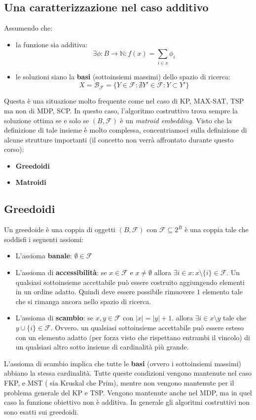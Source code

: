 \documentclass{article}
\begin{document}
\subsection{Una caratterizzazione nel caso additivo}
Assumendo che:
\begin{itemize}
    \item la funzione sia additiva:
          $$\exists\phi : B\rightarrow\mathbb{N}:f(x)=\sum_{i\in x}\phi_i$$
    \item le soluzioni siano la \textbf{basi} (sottoinsiemi massimi) dello spazio di ricerca:
          $$X=\mathcal{B}_\mathcal{F}=\{Y\in\mathcal{F}:\nexists Y'\in\mathcal{F}:Y\subset Y'\}$$
\end{itemize}
Questa è una situazione molto frequente come nel caso di KP, MAX-SAT, TSP ma non di MDP, SCP.
In questo caso, l'algoritmo costruttivo trova sempre la soluzione ottima se e solo se $(B,\mathcal{F})$
è un \textit{matroid embedding}. Visto che la definizione di tale insieme è molto complessa,
concentriamoci sulla definizione di alcune strutture importanti (il concetto non verrà
affrontato durante questo corso):
\begin{itemize}
    \item \textbf{Greedoidi}
    \item \textbf{Matroidi}
\end{itemize}

\subsection{Greedoidi}
Un greedoide è una coppia di oggetti $(B,\mathcal{F})$ con
$\mathcal{F}\subseteq 2^B$ è una coppia tale che soddisfi i seguenti assiomi:
\begin{itemize}
    \item L'assioma \textbf{banale}: $\emptyset\in\mathcal{F}$
    \item L'assioma di \textbf{accessibilità}: se $x\in\mathcal{F}$ e $x\neq\emptyset$ allora
          $\exists i\in x:x\setminus\{i\}\in\mathcal{F}$. Un qualsiasi sottoinsieme accettabile può
          essere costruito aggiungendo elementi in un ordine adatto. Quindi deve essere possibile
          rimuovere $1$ elemento tale che si rimanga ancora nello spazio di ricerca.
    \item L'assioma di \textbf{scambio}: se $x,y\in\mathcal{F}$ con $|x|=|y|+1$. allora $\exists i\in x\setminus y$
          tale che $y\cup\{i\}\in\mathcal{F}$. Ovvero. un qualsiasi sottoinsieme accettabile può
          essere esteso con un elemento adatto (per forza visto che rispettano entrambi il vincolo)
          di un qualsiasi altro sotto insieme di cardinalità più grande.
\end{itemize}
L'assioma di scambio implica che tutte le \textbf{basi} (ovvero i sottoinsiemi massimi)
abbiano la stessa cardinalità. Tutte queste condizioni vengono mantenute nel caso FKP, e MST (
sia Kruskal che Prim), mentre non vengono mantenute per il problema generale del KP e TSP.
Vengono mantenute anche nel MDP, ma in quel caso la funzione obiettivo non è additiva. In generale
gli algoritmi costruttivi non sono esatti sui greedoidi.
\end{document}
